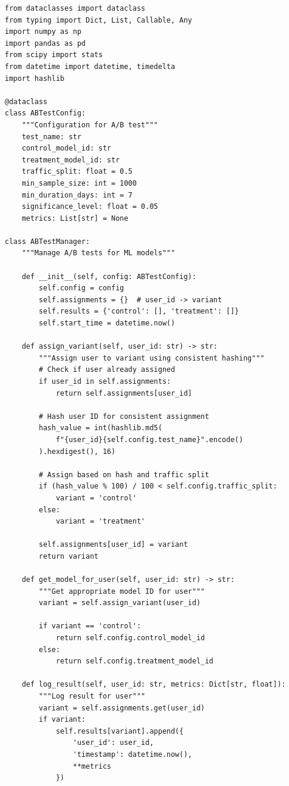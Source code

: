 \begin{lstlisting}[style=python, caption=Production A/B testing framework for ML models]
from dataclasses import dataclass
from typing import Dict, List, Callable, Any
import numpy as np
import pandas as pd
from scipy import stats
from datetime import datetime, timedelta
import hashlib

@dataclass
class ABTestConfig:
    """Configuration for A/B test"""
    test_name: str
    control_model_id: str
    treatment_model_id: str
    traffic_split: float = 0.5
    min_sample_size: int = 1000
    min_duration_days: int = 7
    significance_level: float = 0.05
    metrics: List[str] = None

class ABTestManager:
    """Manage A/B tests for ML models"""

    def __init__(self, config: ABTestConfig):
        self.config = config
        self.assignments = {}  # user_id -> variant
        self.results = {'control': [], 'treatment': []}
        self.start_time = datetime.now()

    def assign_variant(self, user_id: str) -> str:
        """Assign user to variant using consistent hashing"""
        # Check if user already assigned
        if user_id in self.assignments:
            return self.assignments[user_id]

        # Hash user ID for consistent assignment
        hash_value = int(hashlib.md5(
            f"{user_id}{self.config.test_name}".encode()
        ).hexdigest(), 16)

        # Assign based on hash and traffic split
        if (hash_value % 100) / 100 < self.config.traffic_split:
            variant = 'control'
        else:
            variant = 'treatment'

        self.assignments[user_id] = variant
        return variant

    def get_model_for_user(self, user_id: str) -> str:
        """Get appropriate model ID for user"""
        variant = self.assign_variant(user_id)

        if variant == 'control':
            return self.config.control_model_id
        else:
            return self.config.treatment_model_id

    def log_result(self, user_id: str, metrics: Dict[str, float]):
        """Log result for user"""
        variant = self.assignments.get(user_id)
        if variant:
            self.results[variant].append({
                'user_id': user_id,
                'timestamp': datetime.now(),
                **metrics
            })


\end{lstlisting}
